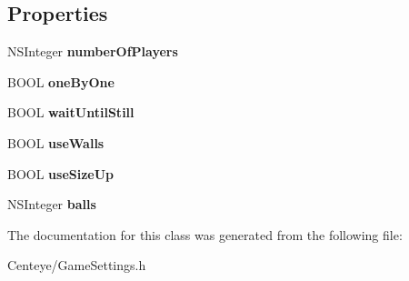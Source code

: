 \subsection*{Properties}
\begin{DoxyCompactItemize}
\item 
\hypertarget{interface_game_settings_a416a576c7d8af90c4d2184c46fcd88fe}{N\+S\+Integer {\bfseries number\+Of\+Players}}\label{interface_game_settings_a416a576c7d8af90c4d2184c46fcd88fe}

\item 
\hypertarget{interface_game_settings_a0aa6dff7097941bc44415ecb5621e929}{B\+O\+O\+L {\bfseries one\+By\+One}}\label{interface_game_settings_a0aa6dff7097941bc44415ecb5621e929}

\item 
\hypertarget{interface_game_settings_a4834e30796b43e263b411dbb715c4f22}{B\+O\+O\+L {\bfseries wait\+Until\+Still}}\label{interface_game_settings_a4834e30796b43e263b411dbb715c4f22}

\item 
\hypertarget{interface_game_settings_a10a3b35f1dbfb828a2ecb39108833551}{B\+O\+O\+L {\bfseries use\+Walls}}\label{interface_game_settings_a10a3b35f1dbfb828a2ecb39108833551}

\item 
\hypertarget{interface_game_settings_ad59e90cf13cbc22738be7eb191081df1}{B\+O\+O\+L {\bfseries use\+Size\+Up}}\label{interface_game_settings_ad59e90cf13cbc22738be7eb191081df1}

\item 
\hypertarget{interface_game_settings_a11dcbad5dcfc934e99509bbf2d4f2e0c}{N\+S\+Integer {\bfseries balls}}\label{interface_game_settings_a11dcbad5dcfc934e99509bbf2d4f2e0c}

\end{DoxyCompactItemize}


The documentation for this class was generated from the following file\+:\begin{DoxyCompactItemize}
\item 
Centeye/Game\+Settings.\+h\end{DoxyCompactItemize}
